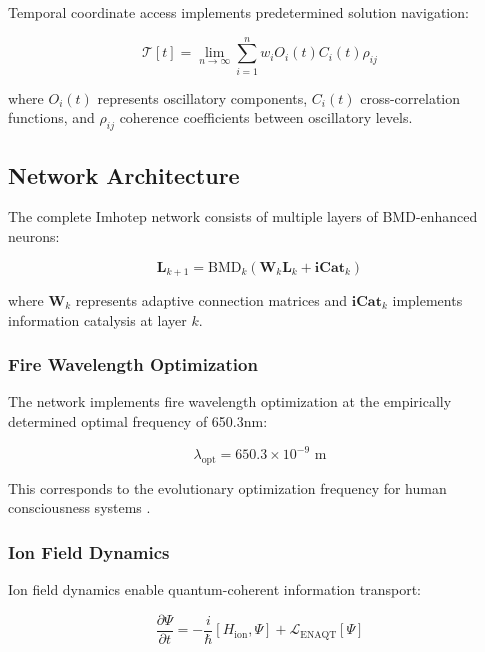 \documentclass[12pt,a4paper]{article}
\theoremstyle{remark}
\begin{document}
Temporal coordinate access implements predetermined solution navigation:

\begin{equation}
\mathcal{T}[t] = \lim_{n \to \infty} \sum_{i=1}^{n} w_i O_i(t) C_i(t) \rho_{ij}
\end{equation}

where $O_i(t)$ represents oscillatory components, $C_i(t)$ cross-correlation functions, and $\rho_{ij}$ coherence coefficients between oscillatory levels.

\subsection{Network Architecture}

The complete Imhotep network consists of multiple layers of BMD-enhanced neurons:

\begin{equation}
\mathbf{L}_{k+1} = \text{BMD}_k\left(\mathbf{W}_k \mathbf{L}_k + \mathbf{iCat}_k\right)
\end{equation}

where $\mathbf{W}_k$ represents adaptive connection matrices and $\mathbf{iCat}_k$ implements information catalysis at layer $k$.

\subsubsection{Fire Wavelength Optimization}

The network implements fire wavelength optimization at the empirically determined optimal frequency of 650.3nm:

\begin{equation}
\lambda_{\text{opt}} = 650.3 \times 10^{-9} \text{ m}
\end{equation}

This corresponds to the evolutionary optimization frequency for human consciousness systems \cite{sachikonye2024biooscillations}.

\subsubsection{Ion Field Dynamics}

Ion field dynamics enable quantum-coherent information transport:

\begin{equation}
\frac{\partial \Psi}{\partial t} = -\frac{i}{\hbar}[H_{\text{ion}}, \Psi] + \mathcal{L}_{\text{ENAQT}}[\Psi]
\end{equation}
\end{document}

